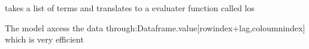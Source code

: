 \documentclass[letterpaper,10pt,english]{sphinxmanual}
\begin{document}
\begin{fulllineitems}
\begin{fulllineitems}
\end{fulllineitems}


\begin{fulllineitems}
\label{\detokenize{core/modelclass:modelclass.Solver_Mixin.outsolve1dcunk}}
\pysigstartsignatures
{}
\pysigstopsignatures
\sphinxAtStartPar
takes a list of terms and translates to a evaluater function called los

\sphinxAtStartPar
The model axcess the data through:Dataframe.value{[}rowindex+lag,coloumnindex{]} which is very efficient

\end{fulllineitems}



\end{fulllineitems}
\end{document}
